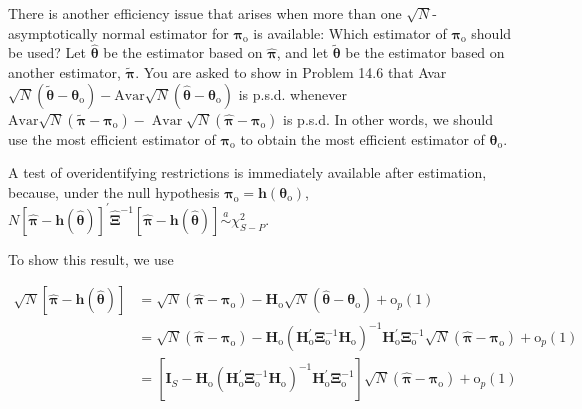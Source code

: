 \documentclass[10pt]{article}
\begin{document}
There is another efficiency issue that arises when more than one $\sqrt{N}$-asymptotically normal estimator for $\boldsymbol{\pi}_{\mathrm{o}}$ is available: Which estimator of $\boldsymbol{\pi}_{\mathrm{o}}$ should be used? Let $\hat{\boldsymbol{\theta}}$ be the estimator based on $\hat{\boldsymbol{\pi}}$, and let $\tilde{\boldsymbol{\theta}}$ be the estimator based on another estimator, $\tilde{\boldsymbol{\pi}}$. You are asked to show in Problem 14.6 that Avar $\sqrt{N}\left(\tilde{\boldsymbol{\theta}}-\boldsymbol{\theta}_{\mathrm{o}}\right)-\mathrm{Avar} \sqrt{N}\left(\hat{\boldsymbol{\theta}}-\boldsymbol{\theta}_{\mathrm{o}}\right)$ is p.s.d. whenever $\mathrm{Avar} \sqrt{N}\left(\tilde{\boldsymbol{\pi}}-\boldsymbol{\pi}_{\mathrm{o}}\right)-\operatorname{Avar} \sqrt{N}\left(\hat{\boldsymbol{\pi}}-\boldsymbol{\pi}_{\mathrm{o}}\right)$ is p.s.d. In other words, we should use the most efficient estimator of $\boldsymbol{\pi}_{\mathrm{o}}$ to obtain the most efficient estimator of $\boldsymbol{\theta}_{\mathrm{o}}$.

A test of overidentifying restrictions is immediately available after estimation, because, under the null hypothesis $\boldsymbol{\pi}_{\mathrm{o}}=\mathbf{h}\left(\boldsymbol{\theta}_{\mathrm{o}}\right)$,\\
$N[\hat{\boldsymbol{\pi}}-\mathbf{h}(\hat{\boldsymbol{\theta}})]^{\prime} \hat{\boldsymbol{\Xi}}^{-1}[\hat{\boldsymbol{\pi}}-\mathbf{h}(\hat{\boldsymbol{\theta}})] \stackrel{a}{\sim} \chi_{S-P}^{2}$.

To show this result, we use

$$
\begin{aligned}
\sqrt{N}[\hat{\boldsymbol{\pi}}-\mathbf{h}(\hat{\boldsymbol{\theta}})] & =\sqrt{N}\left(\hat{\boldsymbol{\pi}}-\boldsymbol{\pi}_{\mathrm{o}}\right)-\mathbf{H}_{\mathrm{o}} \sqrt{N}\left(\hat{\boldsymbol{\theta}}-\boldsymbol{\theta}_{\mathrm{o}}\right)+\mathrm{o}_{p}(1) \\
& =\sqrt{N}\left(\hat{\boldsymbol{\pi}}-\boldsymbol{\pi}_{\mathrm{o}}\right)-\mathbf{H}_{\mathrm{o}}\left(\mathbf{H}_{\mathrm{o}}^{\prime} \boldsymbol{\Xi}_{\mathrm{o}}^{-1} \mathbf{H}_{\mathrm{o}}\right)^{-1} \mathbf{H}_{\mathrm{o}}^{\prime} \boldsymbol{\Xi}_{\mathrm{o}}^{-1} \sqrt{N}\left(\hat{\boldsymbol{\pi}}-\boldsymbol{\pi}_{\mathrm{o}}\right)+\mathrm{o}_{p}(1) \\
& =\left[\mathbf{I}_{S}-\mathbf{H}_{\mathrm{o}}\left(\mathbf{H}_{\mathrm{o}}^{\prime} \boldsymbol{\Xi}_{\mathrm{o}}^{-1} \mathbf{H}_{\mathrm{o}}\right)^{-1} \mathbf{H}_{\mathrm{o}}^{\prime} \boldsymbol{\Xi}_{\mathrm{o}}^{-1}\right] \sqrt{N}\left(\hat{\boldsymbol{\pi}}-\boldsymbol{\pi}_{\mathrm{o}}\right)+\mathrm{o}_{p}(1)
\end{aligned}
$$
\end{document}
